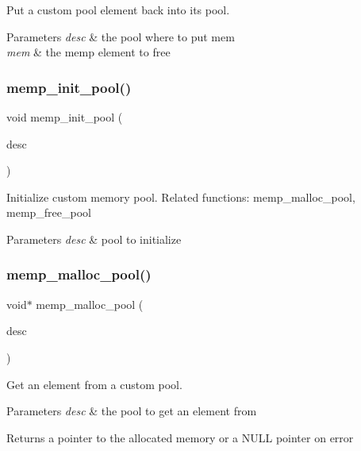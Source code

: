 Put a custom pool element back into its pool.


\begin{DoxyParams}{Parameters}
{\em desc} & the pool where to put mem \\
\hline
{\em mem} & the memp element to free \\
\hline
\end{DoxyParams}
\mbox{\label{openmote-cc2538_2lwip_2src_2include_2lwip_2priv_2memp__priv_8h_a6416303426d05526bed33f241fa6ecd7}} 
\subsubsection{\texorpdfstring{memp\+\_\+init\+\_\+pool()}{memp\_init\_pool()}}
{\footnotesize\ttfamily void memp\+\_\+init\+\_\+pool (\begin{DoxyParamCaption}\item[{const struct \hyperlink{structmemp__desc}{memp\+\_\+desc} $\ast$}]{desc }\end{DoxyParamCaption})}

Initialize custom memory pool. Related functions\+: memp\+\_\+malloc\+\_\+pool, memp\+\_\+free\+\_\+pool


\begin{DoxyParams}{Parameters}
{\em desc} & pool to initialize \\
\hline
\end{DoxyParams}
\mbox{\label{openmote-cc2538_2lwip_2src_2include_2lwip_2priv_2memp__priv_8h_a348c83ee972f1edf7296a1cdf1d75f22}} 
\subsubsection{\texorpdfstring{memp\+\_\+malloc\+\_\+pool()}{memp\_malloc\_pool()}}
{\footnotesize\ttfamily void$\ast$ memp\+\_\+malloc\+\_\+pool (\begin{DoxyParamCaption}\item[{const struct \hyperlink{structmemp__desc}{memp\+\_\+desc} $\ast$}]{desc }\end{DoxyParamCaption})}

Get an element from a custom pool.


\begin{DoxyParams}{Parameters}
{\em desc} & the pool to get an element from\\
\hline
\end{DoxyParams}
\begin{DoxyReturn}{Returns}
a pointer to the allocated memory or a N\+U\+LL pointer on error 
\end{DoxyReturn}
